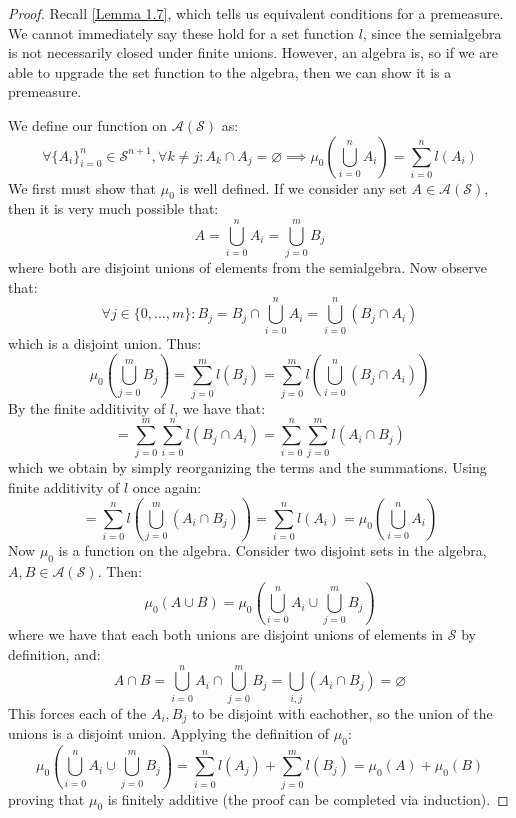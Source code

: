 \documentclass[10pt,letterpaper]{article} %
\begin{document}
\begin{proof}
Recall \cref{Lemma 1.7}, which tells us equivalent conditions for a premeasure. We cannot immediately say these hold for a set function $l$, since the semialgebra is not necessarily closed under finite unions. However, an algebra is, so if we are able to upgrade the set function to the algebra, then we can show it is a premeasure.

We define our function on $\mathcal{A}(\mathcal{S})$ as:
\begin{equation*}
\forall \{A_i\}_{i=0}^n \in \mathcal{S}^{n+1}, \forall k \neq j: A_k \cap A_j = \varnothing \implies \mu_0\left(\bigcup_{i=0}^n A_i\right) = \sum_{i=0}^{n}l(A_i)
\end{equation*}
We first must show that $\mu_0$ is well defined. If we consider any set $A \in \mathcal{A}(\mathcal{S})$, then it is very much possible that:
\begin{equation*}
A = \bigcup_{i=0}^n A_i = \bigcup_{j=0}^m B_j
\end{equation*}
where both are disjoint unions of elements from the semialgebra. Now observe that:
\begin{equation*}
\forall j \in \{0, ..., m\}: B_j = B_j \cap \bigcup_{i=0}^n A_i = \bigcup_{i=0}^n (B_j \cap A_i)
\end{equation*}
which is a disjoint union. Thus:
\begin{equation*}
\mu_0\left(\bigcup_{j=0}^mB_j\right) = \sum_{j=0}^m l(B_j) = \sum_{j=0}^m l\left(\bigcup_{i=0}^n (B_j \cap A_i)\right)
\end{equation*}
By the finite additivity of $l$, we have that:
\begin{equation*}
= \sum_{j=0}^m \sum_{i=0}^n l(B_j \cap A_i) = \sum_{i=0}^n \sum_{j=0}^m l(A_i \cap B_j)
\end{equation*}
which we obtain by simply reorganizing the terms and the summations. Using finite additivity of $l$ once again:
\begin{equation*}
= \sum_{i=0}^n l\left(\bigcup_{j=0}^m (A_i \cap B_j)\right) = \sum_{i=0}^n l(A_i) = \mu_0\left(\bigcup_{i=0}^n A_i\right)
\end{equation*}
Now $\mu_0$ is a function on the algebra. Consider two disjoint sets in the algebra, $A, B \in \mathcal{A}(\mathcal{S})$. Then:
\begin{equation*}
\mu_0(A \cup B) = \mu_0\left(\bigcup_{i=0}^n A_i \cup \bigcup_{j=0}^mB_j\right)
\end{equation*}
where we have that each both unions are disjoint unions of elements in $\mathcal{S}$ by definition, and:
\begin{equation*}
A \cap B = \bigcup_{i=0}^n A_i \cap \bigcup_{j=0}^m B_j = \bigcup_{i, j}(A_i \cap B_j) = \varnothing
\end{equation*}
This forces each of the $A_i, B_j$ to be disjoint with eachother, so the union of the unions is a disjoint union. Applying the definition of $\mu_0$:
\begin{equation*}
\mu_0\left(\bigcup_{i=0}^n A_i \cup \bigcup_{j=0}^mB_j\right) = \sum_{i=0}^n l(A_j) + \sum_{j=0}^{m}l(B_j) = \mu_0(A) + \mu_0(B)
\end{equation*}
proving that $\mu_0$ is finitely additive (the proof can be completed via induction).


\end{proof}
\end{document}
